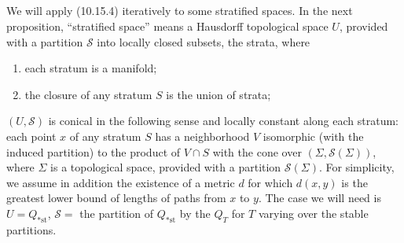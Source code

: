 \documentclass[12pt,a4paper]{article}
\theoremstyle{plain}
\theoremstyle{definition}
\theoremstyle{remark}
\begin{document}
\subsection{}
\label{10.16}

We will apply (10.15.4) iteratively to some stratified spaces. In the next proposition, ``stratified space'' means a Hausdorff topological space $U$, provided with a partition $\mathscr{S}$ into locally closed subsets, the strata, where
\begin{enumerate}
\item[a)] each stratum is a manifold;
\item[b)] the closure of any stratum $S$ is the union of strata;
\end{enumerate}
$(U, \mathscr{S})$ is conical in the following sense and locally constant along each stratum: each point $x$ of any stratum $S$ has a neighborhood $V$ isomorphic (with the induced partition) to the product of $V \cap S$ with the cone over $(\Sigma, \mathscr{S}(\Sigma))$, where $\Sigma$ is a topological space, provided with a partition $\mathscr{S}(\Sigma)$. For simplicity, we assume in addition the existence of a metric $d$ for which $d(x, y)$ is the greatest lower bound of lengths of paths from $x$ to $y$. The case we will need is $U = Q_{*\text{st}}$, $\mathscr{S} =$ the partition of $Q_{*\text{st}}$ by the $Q_T$ for $T$ varying over the stable partitions.
\end{document}
